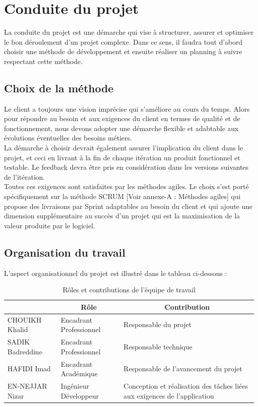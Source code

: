
\section{Conduite du projet}
La conduite du projet est une démarche qui vise à structurer, assurer et optimiser le bon déroulement d’un projet complexe. Dans ce sens, il faudra tout d’abord choisir une méthode de développement et ensuite réaliser un planning à suivre respectant cette méthode.

\subsection{Choix de la méthode}
Le client a toujours une vision imprécise qui s’améliore au cours du temps. Alors pour répondre au besoin et aux exigences du client en termes de qualité et de fonctionnement, nous devons adopter une démarche flexible et adabtable aux évolutions éventuelles des besoins métiers. \\

La démarche à choisir devrait également assurer l’implication du client dans le projet, et ceci en livrant à la fin de chaque itération un produit fonctionnel et testable. Le feedback devra être pris en considération dans les versions suivantes de l’itération.\\

Toutes ces exigences sont satisfaites par les méthodes agiles. Le choix s’est porté spécifiquement sur la méthode SCRUM [Voir annexe-A : Méthodes agiles] qui propose des livraisons par Sprint adaptables au besoin du client et qui ajoute une dimension supplémentaire au succès d’un projet qui est la maximisation de la valeur produite par le logiciel.

\subsection{Organisation du travail}
L’aspect organisationnel du projet est illustré dans le tableau ci-dessous :

\begin{table}[!h]
\begin{tabular}{|p{4cm}|p{4.5cm}|p{5.5cm}|}%
\rowcolor{shadecolor}\multicolumn{1}{|c|}{Nom} &\multicolumn{1}{|c|}{Rôle}&\multicolumn{1}{|c|}{Contribution}\\
\hline
CHOUIKH Khalid&Encadrant Professionnel&Responsable du projet\\
\hline
SADIK Badreddine&Encadrant Professionnel&Responsable technique \\
\hline
HAFIDI Imad&Encadrant Académique&Responsable de l'avancement du projet\\
\hline
EN-NEJJAR Nizar&Ingénieur Développeur&Conception et réalisation des tâches liées aux exigences de l'application\\
\hline
\end{tabular}
\centering \caption{Rôles et contributions de l'équipe de travail} \label{TablePR}
\end{table}
